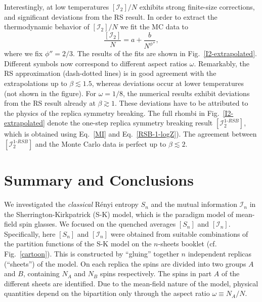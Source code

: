 \documentclass[twocolumn,superscriptaddress,prb,10pt]{revtex4-1}
\begin{document}
Interestingly, at low temperatures $[{\mathcal I}_2]/N$ exhibits strong finite-size corrections, 
and significant deviations from the RS result. In order to extract the thermodynamic behavior of 
$[{\mathcal I}_2]/N$ we fit the MC data to 
%
\begin{equation}
\frac{[{\mathcal I}_2]}{N}=a+\frac{b}{N^{\phi''}},
\end{equation}
%
where we fix $\phi''=2/3$. The results of the fits are shown in Fig.~\ref{I2-extrapolated}.  
Different symbols now correspond to different aspect ratios $\omega$. Remarkably, the RS 
approximation (dash-dotted lines) is in good agreement with the extrapolations up to $\beta\lesssim 1.5$, 
whereas deviations occur at lower temperatures (not shown in the figure). 
For $\omega=1/8$, the numerical results exhibit deviations from the RS result already at $\beta\gtrsim 1$. 
These deviations have to be attributed to the physics of the replica symmetry breaking. 
The full rhombi in Fig.~\ref{I2-extrapolated} denote the one-step replica symmetry breaking result 
$[{\mathcal I}_2^{1\textrm{-}RSB}]$, which is obtained using Eq.~\eqref{MI} and Eq.~\eqref{RSB-1-logZ}). 
The agreement between $[{\mathcal I}_2^{1\textrm{-}RSB}]$ and the Monte Carlo data is perfect 
up to $\beta\lesssim 2$. 
 


\section{Summary and Conclusions}
\label{conclusions}

We investigated the \emph{classical} R\'enyi entropy $S_n$ and the mutual information 
${\mathcal I}_n$ in the Sherrington-Kirkpatrick (S-K) model, which is the paradigm model 
of mean-field spin glasses. We focused on the quenched averages $[S_n]$ and $[{\mathcal I}_n]$. 
Specifically, here $[S_n]$ and $[{\mathcal I}_n]$ were obtained from suitable combinations 
of the partition functions of the S-K model on the $n$-sheets booklet (cf. Fig.~\ref{cartoon}). 
This is constructed by ``gluing'' together $n$ independent replicas (``sheets'') of the model. 
On each replica the spins are divided into two groups $A$ and $B$, containing $N_A$ and $N_B$ 
spins respectively. The spins in part $A$ of the different sheets are identified. Due to the 
mean-field nature of the model, physical quantities depend on the bipartition only through the 
aspect ratio $\omega\equiv N_A/N$. 
\end{document}
